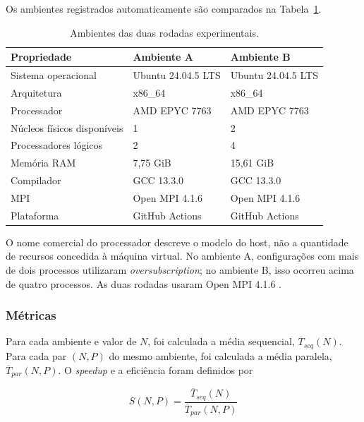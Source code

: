 \documentclass[12pt,a4paper]{article}
\begin{document}
Os ambientes registrados automaticamente são comparados na
Tabela~\ref{tab:ambiente}.

\begin{table}[ht]
    \centering
    \caption{Ambientes das duas rodadas experimentais.}
    \label{tab:ambiente}
    \begin{tabular}{p{}p{}p{}}
        \toprule
        \textbf{Propriedade} & \textbf{Ambiente A} & \textbf{Ambiente B} \\
        \midrule
        Sistema operacional & Ubuntu 24.04.5 LTS & Ubuntu 24.04.5 LTS \\
        Arquitetura & x86\_64 & x86\_64 \\
        Processador & AMD EPYC 7763 & AMD EPYC 7763 \\
        Núcleos físicos disponíveis & 1 & 2 \\
        Processadores lógicos & 2 & 4 \\
        Memória RAM & 7,75 GiB & 15,61 GiB \\
        Compilador & GCC 13.3.0 & GCC 13.3.0 \\
        MPI & Open MPI 4.1.6 & Open MPI 4.1.6 \\
        Plataforma & GitHub Actions & GitHub Actions \\
        \bottomrule
    \end{tabular}
\end{table}

O nome comercial do processador descreve o modelo do host, não a quantidade
de recursos concedida à máquina virtual. No ambiente A, configurações com mais
de dois processos utilizaram \textit{oversubscription}; no ambiente B, isso
ocorreu acima de quatro processos. As duas rodadas usaram Open MPI 4.1.6
\cite{openmpi}.

\subsubsection{Métricas}

Para cada ambiente e valor de $N$, foi calculada a média sequencial,
$\overline{T}_{seq}(N)$. Para cada par $(N,P)$ do mesmo ambiente, foi calculada
a média paralela, $\overline{T}_{par}(N,P)$. O \textit{speedup} e a eficiência
foram definidos por

\begin{equation}
    S(N,P)=\frac{\overline{T}_{seq}(N)}{\overline{T}_{par}(N,P)}
\end{equation}
\end{document}
